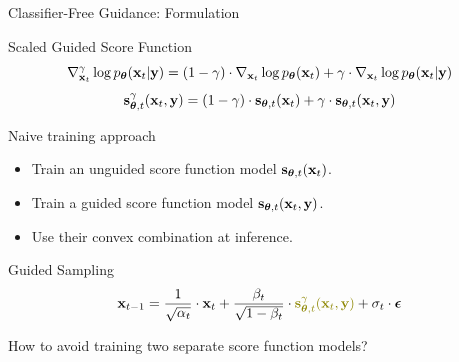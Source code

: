 \documentclass{beamer}
\begin{document}
\begin{frame}{Classifier-Free Guidance: Formulation}
	\begin{block}{Scaled Guided Score Function}
		\vspace{-0.5cm}
		\[
			\nabla_{\mathbf{x}_t}^{\gamma} \log p_{\boldsymbol{\theta}}(\mathbf{x}_t | \mathbf{y}) =  (1 - \gamma) \cdot  \nabla_{\mathbf{x}_t} \log p_{\boldsymbol{\theta}}(\mathbf{x}_t) + \gamma \cdot  \nabla_{\mathbf{x}_t} \log p_{\boldsymbol{\theta}}(\mathbf{x}_t| \mathbf{y})
		\]
		\vspace{-0.5cm}
		\eqpause
		\[
			\mathbf{s}^{\gamma}_{\boldsymbol{\theta}, t}(\mathbf{x}_t, \mathbf{y}) = (1 - \gamma) \cdot \mathbf{s}_{\boldsymbol{\theta}, t}(\mathbf{x}_t) +  \gamma \cdot \mathbf{s}_{\boldsymbol{\theta}, t}(\mathbf{x}_t, \mathbf{y})
		\]
		\vspace{-0.5cm}
	\end{block}
	\eqpause
	\begin{block}{Naive training approach}
		\begin{itemize}
			\item Train an unguided score function model $\mathbf{s}_{\boldsymbol{\theta}, t}(\mathbf{x}_t)$.
			\item Train a guided score function model $\mathbf{s}_{\boldsymbol{\theta}, t}(\mathbf{x}_t, \mathbf{y})$.
			\eqpause
			\item Use their convex combination at inference.
		\end{itemize}
	\end{block}
	\begin{block}{Guided Sampling}
		\vspace{-0.3cm}
		\[
			\bx_{t-1} = \frac{1}{\sqrt{\alpha_t}} \cdot \bx_t + \frac{\beta_t}{\sqrt{1 - \beta_t}} \cdot  {\color{olive}\bs^{\gamma}_{\btheta, t}(\bx_t, \by)} + \sigma_t \cdot \bepsilon
		\]
		\vspace{-0.3cm}
	\end{block}
	\eqpause
	How to avoid training two separate score function models?
\end{frame}
\end{document}
